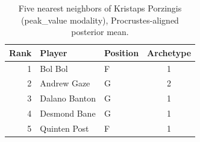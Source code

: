 \begin{table}[htbp]
  \centering\small
  \begin{tabular}{rllc}
    \toprule
    Rank & Player & Position & Archetype \\
    \midrule
    1 & Bol Bol & F & 1 \\
    2 & Andrew Gaze & G & 2 \\
    3 & Dalano Banton & G & 1 \\
    4 & Desmond Bane & G & 1 \\
    5 & Quinten Post & F & 1 \\
    \bottomrule
  \end{tabular}
  \caption{Five nearest neighbors of Kristaps Porzingis (peak_value modality), Procrustes-aligned posterior mean.}
  \label{tab:Kristaps_Porzingis_neighbors_peak_value}
\end{table}

